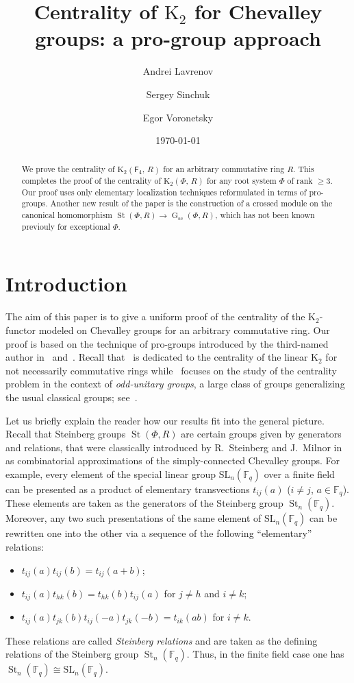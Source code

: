 \documentclass[oneside, 11pt]{amsart}
\title{Centrality of $\mathrm K_2$ for Chevalley groups: a pro-group approach}
\author[1] {Andrei Lavrenov} \email{avlavrenov at gmail.com}
\author[2] {Sergey Sinchuk} \email{sinchukss at gmail.com}
\author[3] {Egor Voronetsky} \email{voronetckiiegor at yandex.ru}
\date {\today}
\numberwithin{equation}{section}
\theoremstyle{definition}
\theoremstyle{remark}
\DeclareMathOperator\St{St}
\DeclareMathOperator\GG{G}
\newcommand{\rF}{\mathsf{F}}
\begin{document}
\maketitle
\begin{abstract} 
We prove the centrality of $\mathrm K_2 (\rF_4, \,R)$ for an arbitrary commutative ring $R$. This completes the proof of the centrality of $\mathrm K_2(\Phi,\, R)$ for any root system $\Phi$ of rank $\geq 3$. Our proof uses only elementary localization techniques reformulated in terms of pro-groups. 
Another new result of the paper is the construction of a crossed module on the canonical homomorphism $\St(\Phi, R) \to \GG_\mathrm{sc}(\Phi, R)$, which has not been known previouly for exceptional $\Phi$. \end{abstract}

\section{Introduction}
The aim of this paper is to give a uniform proof of the centrality of the $\mathrm{K}_2$-functor modeled on Chevalley groups for an arbitrary commutative ring.
Our proof is based on the technique of pro-groups introduced by the third-named author in~\cite{Vor1} and~\cite{Vor2}.
Recall that~\cite{Vor1} is dedicated to the centrality of the linear $\mathrm{K}_2$ for not necessarily commutative rings while~\cite{Vor2} focuses on the study of the centrality problem in the context of {\it odd-unitary groups}, a large class of groups generalizing the usual classical groups; see~\cite{Pe05}.

Let us briefly explain the reader how our results fit into the general picture.
Recall that Steinberg groups $\St(\Phi, R)$ are certain groups given by generators and relations, that were classically introduced by R.~Steinberg and J.~Milnor in~\cite{St62, Milnor} as combinatorial approximations of the simply-connected Chevalley groups. For example, every element of the special linear group $\mathrm{SL}_n(\mathbb F_q)$ over a finite field can be presented as a product of elementary transvections $t_{ij}(a)$ ($i\neq j$, $a\in \mathbb F_q$). These elements are taken as the generators of the Steinberg group $\St_n(\mathbb{F}_q)$. 
Moreover, any two such presentations of the same element of $\mathrm{SL}_n(\mathbb{F}_q)$ can be rewritten one into the other
 via a sequence of the following ``elementary'' relations: 
\begin{itemize} 
 \item $t_{ij}(a)t_{ij}(b) = t_{ij}(a+b)$; 
 \item $t_{ij}(a)t_{hk}(b) = t_{hk}(b)t_{ij}(a)$ for $j\neq h$ and $i\neq k$; 
 \item $t_{ij}(a)t_{jk}(b)t_{ij}(-a)t_{jk}(-b) = t_{ik}(ab)$ for $i\neq k$.
\end{itemize} 
These relations are called {\it Steinberg relations} and are taken as the defining relations of the Steinberg group $\St_n(\mathbb{F}_q)$. Thus, in the finite field case one has $\St_n(\mathbb{F}_q) \cong \mathrm{SL}_n(\mathbb{F}_q)$.
\end{document}
